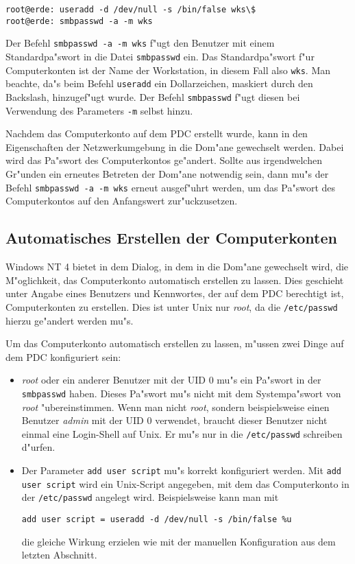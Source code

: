 \documentclass{scrartcl}\usepackage{pslatex}\typearea{12}
\newcommand{\prog}{\texttt}
\newcommand{\param}{\texttt}
\newcommand{\dateistyle}{\texttt}
\newcommand{\nbname}{\texttt}
\begin{document}
\begin{verbatim}
root@erde: useradd -d /dev/null -s /bin/false wks\$
root@erde: smbpasswd -a -m wks
\end{verbatim}

Der Befehl \prog{smbpasswd -a -m wks} f"ugt den Benutzer mit einem
Standardpa"swort in die Datei \dateistyle{smbpasswd} ein. Das
Standardpa"swort f"ur Computerkonten ist der Name der Workstation, in
diesem Fall also \nbname{wks}. Man beachte, da"s beim Befehl
\texttt{useradd} ein Dollarzeichen, maskiert durch den Backslash,
hinzugef"ugt wurde. Der Befehl \prog{smbpasswd} f"ugt diesen bei
Verwendung des Parameters \prog{-m} selbst hinzu.

Nachdem das Computerkonto auf dem PDC erstellt wurde, kann in den
Eigenschaften der Netzwerkumgebung in die Dom"ane gewechselt werden.
Dabei wird das Pa"swort des Computerkontos ge"andert. Sollte aus
irgendwelchen Gr"unden ein erneutes Betreten der Dom"ane notwendig
sein, dann mu"s der Befehl \prog{smbpasswd -a -m wks} erneut
ausgef"uhrt werden, um das Pa"swort des Computerkontos auf den
Anfangswert zur"uckzusetzen.

\subsection{Automatisches Erstellen der Computerkonten}

Windows NT 4 bietet in dem Dialog, in dem in die Dom"ane gewechselt
wird, die M"oglichkeit, das Computerkonto automatisch erstellen zu
lassen. Dies geschieht unter Angabe eines Benutzers und Kennwortes,
der auf dem PDC berechtigt ist, Computerkonten zu erstellen. Dies ist
unter Unix nur \emph{root}, da die \dateistyle{/etc/passwd} hierzu
ge"andert werden mu"s.

Um das Computerkonto automatisch erstellen zu lassen, m"ussen zwei
Dinge auf dem PDC konfiguriert sein:

\begin{itemize}
\item \emph{root} oder ein anderer Benutzer mit der UID 0 mu"s ein
  Pa"swort in der \dateistyle{smbpasswd} haben. Dieses Pa"swort mu"s
  nicht mit dem Systempa"swort von \emph{root} "ubereinstimmen. Wenn
  man nicht \emph{root}, sondern beispielsweise einen Benutzer
  \emph{admin} mit der UID 0 verwendet, braucht dieser Benutzer nicht
  einmal eine Login-Shell auf Unix. Er mu"s nur in die
  \dateistyle{/etc/passwd} schreiben d"urfen.
\item Der Parameter \param{add user script} mu"s korrekt konfiguriert
  werden. Mit \param{add user script} wird ein Unix-Script angegeben,
  mit dem das Computerkonto in der \dateistyle{/etc/passwd} angelegt
  wird. Beispielsweise kann man mit

\begin{verbatim}
add user script = useradd -d /dev/null -s /bin/false %u
\end{verbatim}

  die gleiche Wirkung erzielen wie mit der manuellen Konfiguration aus
  dem letzten Abschnitt.
\end{itemize}
\end{document}
